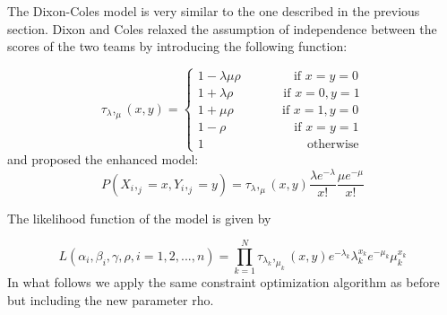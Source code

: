 \documentclass[
]{article}
\begin{document}
The Dixon-Coles model is very similar to the one described in the
previous section. Dixon and Coles relaxed the assumption of independence
between the scores of the two teams by introducing the following
function:

\[
\tau_\lambda,_\mu(x,y) = \begin{cases}
            1-\lambda\mu\rho \qquad \qquad\ \text{if } x=y=0\\
            1+\lambda\rho     \qquad\qquad \text{if } x=0, y=1\\
            1+\mu\rho         \quad \quad\quad\ \ \ \ \text{if } x=1, y=0\\
            1-\rho            \qquad \quad \quad\quad\ \ \text{if } x=y=1\\
            1                  \qquad \qquad \qquad \qquad \ \text{otherwise}
            \end{cases}
\] and proposed the enhanced model: \[
P(X_i,_j = x, Y_i,_j = y) = \tau_\lambda,_\mu(x,y)\frac{\lambda e^{-\lambda}}{x!}\frac{\mu e^{-\mu}}{x!}
\]

The likelihood function of the model is given by

\[
L(\alpha_i,\beta_i,\gamma,\rho,i = 1,2,...,n) = \prod_{k=1}^{N} \tau_{\lambda_k},_{\mu_k}(x,y)e^{-\lambda_k}\lambda_k^{x_k} e^{-\mu_k}\mu_k^{x_k} 
\] In what follows we apply the same constraint optimization algorithm
as before but including the new parameter rho.
\end{document}
